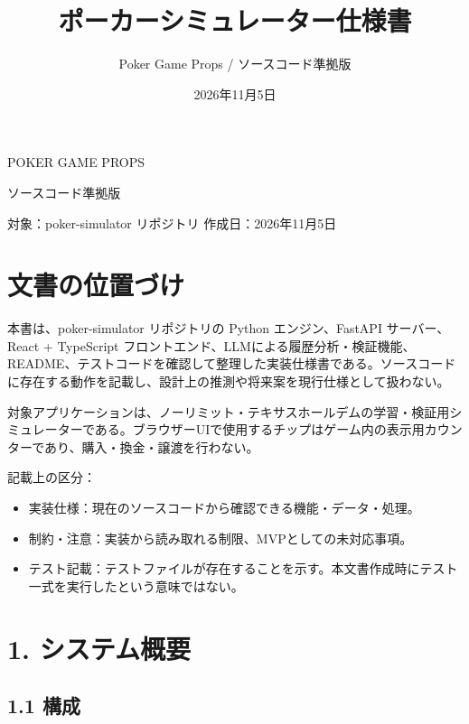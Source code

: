 \documentclass[
]{article}
\title{ポーカーシミュレーター仕様書}
\subtitle{Poker Game Props / ソースコード準拠版}
\author{}
\date{2026年11月5日}
\begin{document}
\maketitle

POKER GAME PROPS

ソースコード準拠版

対象：poker-simulator リポジトリ 作成日：2026年11月5日

\section{文書の位置づけ}\label{ux6587ux66f8ux306eux4f4dux7f6eux3065ux3051}

本書は、poker-simulator リポジトリの Python
エンジン、FastAPI サーバー、React + TypeScript
フロントエンド、LLMによる履歴分析・検証機能、README、テストコードを確認して整理した実装仕様書である。ソースコードに存在する動作を記載し、設計上の推測や将来案を現行仕様として扱わない。

対象アプリケーションは、ノーリミット・テキサスホールデムの学習・検証用シミュレーターである。ブラウザーUIで使用するチップはゲーム内の表示用カウンターであり、購入・換金・譲渡を行わない。

記載上の区分：

\begin{itemize}
\item
  実装仕様：現在のソースコードから確認できる機能・データ・処理。
\item
  制約・注意：実装から読み取れる制限、MVPとしての未対応事項。
\item
  テスト記載：テストファイルが存在することを示す。本文書作成時にテスト一式を実行したという意味ではない。
\end{itemize}

\section{1. システム概要}\label{ux30b7ux30b9ux30c6ux30e0ux6982ux8981}

\subsection{1.1 構成}\label{ux69cbux6210}
\end{document}
